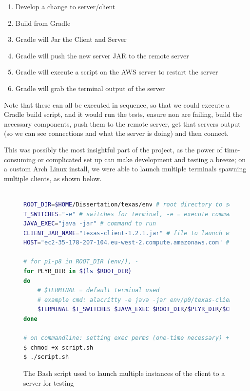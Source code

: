 \documentclass[11pt]{article}
\begin{document}
\begin{enumerate}
	\item Develop a change to server/client
	\item Build from Gradle
	\item Gradle will Jar the Client and Server
	\item Gradle will push the new server JAR to the remote server
	\item Gradle will execute a script on the AWS server to restart the server
	\item Gradle will grab the terminal output of the server \\
\end{enumerate}

Note that these can all be executed in sequence, so that we could execute a Gradle build script, and it would run the tests, ensure non are failing, build the necessary components, push them to the remote server, get that servers output (so we can see connections and what the server is doing) and then connect. 

This was possibly the most insightful part of the project, as the power of time-consuming or complicated set up can make development and testing a breeze; on a custom Arch Linux install, we were able to launch multiple terminals spawning multiple clients, as shown below. \\

\begin{figure}[h]
\begin{lstlisting}[language=bash,frame=single]

ROOT_DIR=$HOME/Dissertation/texas/env # root directory to search in
T_SWITCHES="-e" # switches for terminal, -e = execute command
JAVA_EXEC="java -jar" # command to run
CLIENT_JAR_NAME="texas-client-1.2.1.jar" # file to launch with above
HOST="ec2-35-178-207-104.eu-west-2.compute.amazonaws.com" # server address

# for p1-p8 in ROOT_DIR (env/), -
for PLYR_DIR in $(ls $ROOT_DIR)
do
	# $TERMINAL = default terminal used
	# example cmd: alacritty -e java -jar env/p0/texas-client-1.2.1.jar 192.168.0.1
	$TERMINAL $T_SWITCHES $JAVA_EXEC $ROOT_DIR/$PLYR_DIR/$CLIENT_JAR_NAME $HOST
done

# on commandline: setting exec perms (one-time necessary) + run script
$ chmod +x script.sh
$ ./script.sh
\end{lstlisting}
\caption{The Bash script used to launch multiple instances of the client to a server for testing}
\end{figure}
\end{document}
